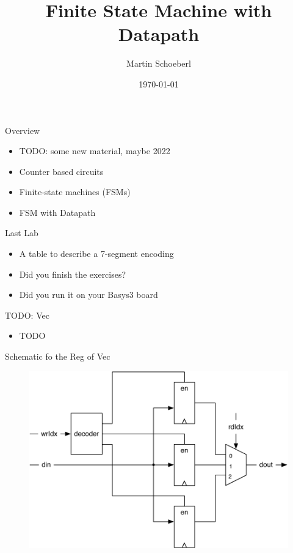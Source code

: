 

\newif\ifbook


\title{Finite State Machine with Datapath}
\author{Martin Schoeberl}
\date{\today}



\begin{frame}
\titlepage
\end{frame}

\begin{frame}[fragile]{Overview}
\begin{itemize}
\item TODO: some new material, maybe 2022
\item Counter based circuits
\item Finite-state machines (FSMs) 
\item FSM with Datapath
\end{itemize}
\end{frame}



\begin{frame}[fragile]{Last Lab}
\begin{itemize}
\item A table to describe a 7-segment encoding
\item Did you finish the exercises?
\item Did you run it on your Basys3 board
\end{itemize}
\end{frame}

\begin{frame}[fragile]{TODO: Vec}
\begin{itemize}
\item TODO
\end{itemize}
\end{frame}

\begin{frame}[fragile]{Schematic fo the Reg of Vec}
\begin{figure}
  \includegraphics[scale=0.6]{../figures/vec-reg}
\end{figure}
\end{frame}

